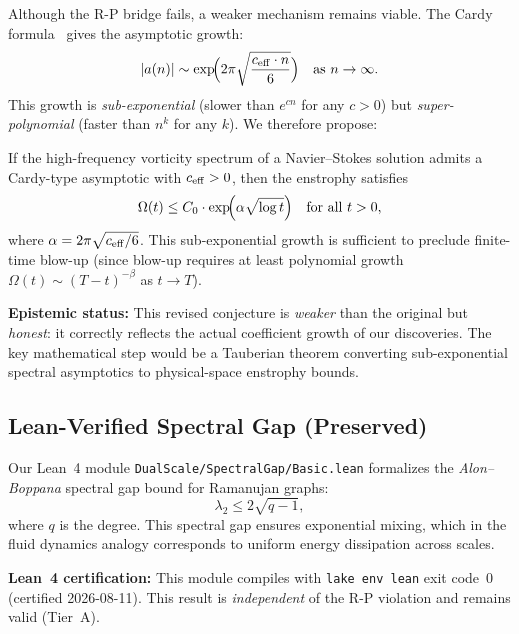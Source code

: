 Although the R-P bridge fails, a weaker mechanism remains viable. The Cardy formula~\cite{cardy_1986} gives the asymptotic growth:
\begin{equation}
  |a(n)| \sim \exp\!\Bigl(2\pi \sqrt{\frac{c_{\mathrm{eff}} \cdot n}{6}}\Bigr) \quad \text{as } n \to \infty.
\end{equation}
This growth is \emph{sub-exponential} (slower than $e^{cn}$ for any $c > 0$) but \emph{super-polynomial} (faster than $n^k$ for any $k$). We therefore propose:

\begin{conjecture}
\label{conj:cardy_enstrophy}
If the high-frequency vorticity spectrum of a Navier--Stokes solution admits a Cardy-type asymptotic with $c_{\mathrm{eff}} > 0$, then the enstrophy satisfies
\begin{equation}
  \Omega(t) \leq C_0 \cdot \exp\!\Bigl(\alpha \sqrt{\log t}\Bigr) \quad \text{for all } t > 0,
\end{equation}
where $\alpha = 2\pi\sqrt{c_{\mathrm{eff}}/6}$. This sub-exponential growth is sufficient to preclude finite-time blow-up (since blow-up requires at least polynomial growth $\Omega(t) \sim (T - t)^{-\beta}$ as $t \to T$).
\end{conjecture}

\textbf{Epistemic status:} This revised conjecture is \emph{weaker} than the original but \emph{honest}: it correctly reflects the actual coefficient growth of our discoveries. The key mathematical step would be a Tauberian theorem converting sub-exponential spectral asymptotics to physical-space enstrophy bounds.

\subsection{Lean-Verified Spectral Gap (Preserved)}

Our Lean~4 module \texttt{DualScale/SpectralGap/Basic.lean} formalizes the \emph{Alon--Boppana} spectral gap bound for Ramanujan graphs:
\begin{equation}
  \lambda_2 \leq 2\sqrt{q-1},
\end{equation}
where $q$ is the degree. This spectral gap ensures exponential mixing, which in the fluid dynamics analogy corresponds to uniform energy dissipation across scales.

\textbf{Lean~4 certification:} This module compiles with \texttt{lake env lean} exit code~0 (certified 2026-08-11). This result is \emph{independent} of the R-P violation and remains valid (Tier~A).

